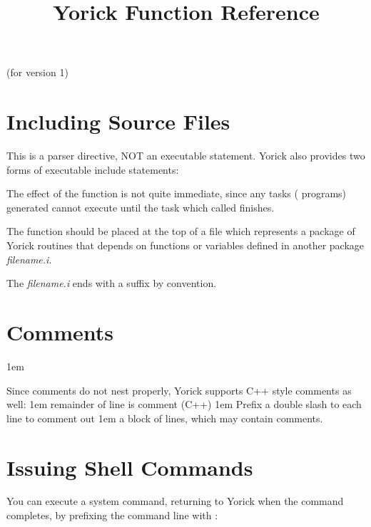 
\title{Yorick Function Reference}

\centerline{(for version 1)}

\section{Including Source Files}


This is a parser directive, NOT an executable statement.  Yorick also
provides two forms of executable include statements:


The effect of the  function is not quite immediate, since
any tasks ( programs) generated cannot execute until the
task which called  finishes.

The  function should be placed at the top of a file which
represents a package of Yorick routines that depends on functions or
variables defined in another package {\it filename.i}.

The {\it filename.i\/} ends with a  suffix by convention.

\section{Comments}

\hglue1em 

Since  comments do not nest properly, Yorick supports
C++ style comments as well:
\begindemo
\hglue1em  remainder of line is comment (C++)
\hglue1em \kbd{//} Prefix a double slash to each line to comment out
\hglue1em \kbd{//} a block of lines, which may contain comments.
\enddemo

\section{Issuing Shell Commands}

You can execute a system command, returning to Yorick when
the command completes, by prefixing the command line with \kbd{\$}:

